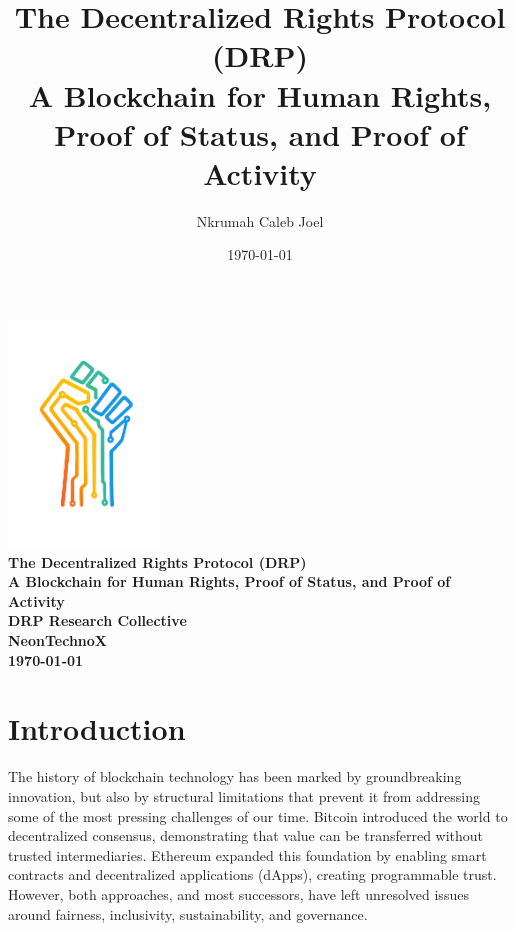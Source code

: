 \documentclass[11pt,a4paper]{article}
\title{\textbf{The Decentralized Rights Protocol (DRP)} \\ 
\large A Blockchain for Human Rights, Proof of Status, and Proof of Activity}
\author{Nkrumah Caleb Joel}
\date{\today}
\begin{document}
\begin{titlepage}
\begin{center}
\vspace{3cm}
\includegraphics[width=0.3\textwidth]{DRP.png}\\[1cm]
\LARGE\bfseries
\textbf{The Decentralized Rights Protocol (DRP)} \\[0.5cm]
\large A Blockchain for Human Rights, Proof of Status, and Proof of Activity\\[2cm]
\large DRP Research Collective\\[1cm]
\large NeonTechnoX\\[1cm]
\today
\end{center}
\end{titlepage}

\newpage
\tableofcontents
\thispagestyle{empty}

\newpage


\section{Introduction}

The history of blockchain technology has been marked by groundbreaking innovation, but also by structural limitations that prevent it from addressing some of the most pressing challenges of our time. Bitcoin introduced the world to decentralized consensus, demonstrating that value can be transferred without trusted intermediaries. Ethereum expanded this foundation by enabling smart contracts and decentralized applications (dApps), creating programmable trust. However, both approaches, and most successors, have left unresolved issues around fairness, inclusivity, sustainability, and governance.
\end{document}
